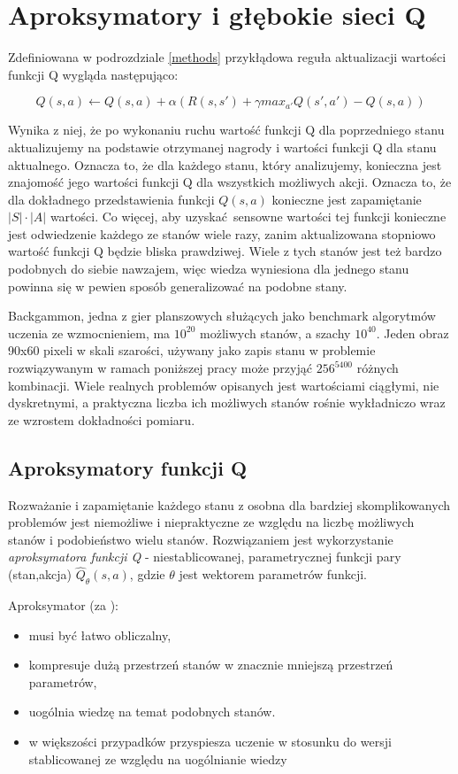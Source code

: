 \section{Aproksymatory i głębokie sieci Q}

Zdefiniowana w podrozdziale \ref{methods} przykłądowa reguła aktualizacji wartości funkcji Q wygląda następująco:

$$Q(s,a) \leftarrow Q(s,a) + \alpha (R(s,s') + \gamma max_{a'}Q(s',a') - Q (s,a))$$

Wynika z niej, że po wykonaniu ruchu wartość funkcji Q dla poprzedniego stanu aktualizujemy na podstawie otrzymanej nagrody i wartości funkcji Q dla stanu aktualnego. Oznacza to, że dla każdego stanu, który analizujemy, konieczna jest znajomość jego wartości funkcji Q dla wszystkich możliwych akcji. Oznacza to, że dla dokładnego przedstawienia funkcji $Q(s,a)$  konieczne jest zapamiętanie $\left\vert{S}\right\vert \cdot \left\vert{A}\right\vert$ wartości. Co więcej, aby uzyskać sensowne wartości tej funkcji konieczne jest odwiedzenie każdego ze stanów wiele razy, zanim aktualizowana stopniowo wartość funkcji Q będzie bliska prawdziwej. Wiele z tych stanów jest też bardzo podobnych do siebie nawzajem, więc wiedza wyniesiona dla jednego stanu powinna się w pewien sposób generalizować na podobne stany.

Backgammon, jedna z gier planszowych służących jako benchmark algorytmów uczenia ze wzmocnieniem, ma $10^{20}$ możliwych stanów, a szachy $10^{40}$. Jeden obraz 90x60 pixeli w skali szarości, używany jako zapis stanu w problemie rozwiązywanym w ramach poniższej pracy może przyjąć $256^{5400}$ różnych kombinacji. Wiele realnych problemów opisanych jest wartościami ciągłymi, nie dyskretnymi, a praktyczna liczba ich możliwych stanów rośnie wykładniczo wraz ze wzrostem dokładności pomiaru.

\subsection{Aproksymatory funkcji Q}

Rozważanie i zapamiętanie każdego stanu z osobna dla bardziej skomplikowanych problemów jest niemożliwe i niepraktyczne ze względu na liczbę możliwych stanów i podobieństwo wielu stanów. Rozwiązaniem jest wykorzystanie \textit {aproksymatora funkcji Q} - niestablicowanej, parametrycznej funkcji pary (stan,akcja) $\hat{Q}_{\theta}(s,a)$, gdzie $\theta$ jest wektorem parametrów funkcji.


Aproksymator (za \cite{wjaskowski2016}):
\begin{itemize}
\item musi być łatwo obliczalny,
\item kompresuje dużą przestrzeń stanów w znacznie mniejszą przestrzeń parametrów,
\item uogólnia wiedzę na temat podobnych stanów.
\item w większości przypadków przyspiesza uczenie w stosunku do wersji stablicowanej ze względu na uogólnianie wiedzy
\end{itemize}

